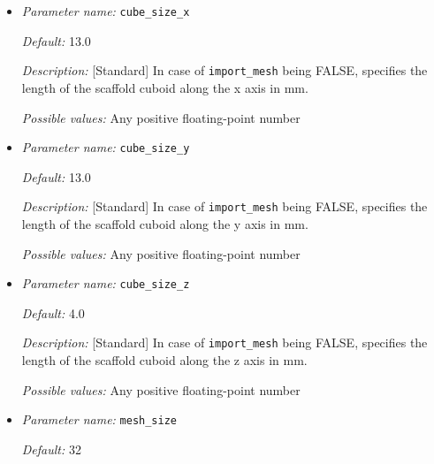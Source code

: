 \begin{itemize}
{\it Default:} 20.0

{\it Description:} [Standard] In case of {\tt import\_mesh} being FALSE, specifies the length of the container box (for the electrolyte) in mm.

{\it Possible values:} Any positive floating-point number 


\item {\it Parameter name:} {\tt cube\_size\_x}
\label{parameters:cube_size_x}


{\it Default:} 13.0

{\it Description:} [Standard] In case of {\tt import\_mesh} being FALSE, specifies the length of the scaffold cuboid along the x axis in mm.

{\it Possible values:} Any positive floating-point number 


\item {\it Parameter name:} {\tt cube\_size\_y}
\label{parameters:cube_size_y}


{\it Default:} 13.0

{\it Description:} [Standard] In case of {\tt import\_mesh} being FALSE, specifies the length of the scaffold cuboid along the y axis in mm.

{\it Possible values:} Any positive floating-point number 


\item {\it Parameter name:} {\tt cube\_size\_z}
\label{parameters:cube_size_z}


{\it Default:} 4.0

{\it Description:} [Standard] In case of {\tt import\_mesh} being FALSE, specifies the length of the scaffold cuboid along the z axis in mm.


{\it Possible values:} Any positive floating-point number 


\item {\it Parameter name:} {\tt mesh\_size}
\label{parameters:mesh_size}


{\it Default:} 32


\end{itemize}

